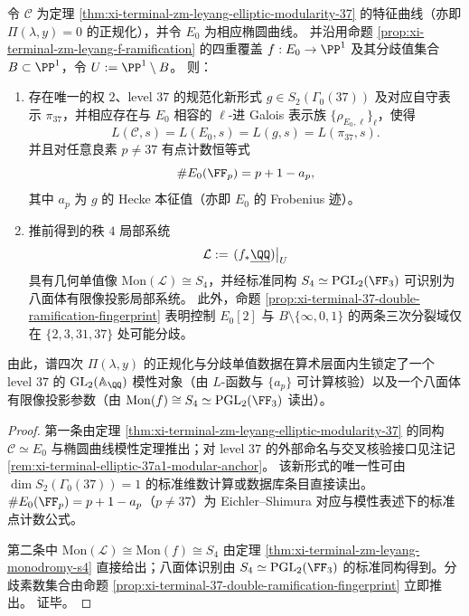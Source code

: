 \begin{corollary}\label{cor:xi-terminal-zm-leyang-langlands-level37}
令 \(\mathcal C\) 为定理 \ref{thm:xi-terminal-zm-leyang-elliptic-modularity-37} 的特征曲线（亦即 \(\Pi(\lambda,y)=0\) 的正规化），并令 \(E_0\) 为相应椭圆曲线。
并沿用命题 \ref{prop:xi-terminal-zm-leyang-f-ramification} 的四重覆盖 \(f:E_0\to\PP^1\) 及其分歧值集合 \(B\subset\PP^1\)，令 \(U:=\PP^1\setminus B\)。
则：
\begin{enumerate}
  \item 存在唯一的权 \(2\)、level \(37\) 的规范化新形式 \(g\in S_2(\Gamma_0(37))\) 及对应自守表示 \(\pi_{37}\)，并相应存在与 \(E_0\) 相容的 \(\ell\)-进 Galois 表示族 \(\{\rho_{E_0,\ell}\}_{\ell}\)，使得
  \[
  L(\mathcal C,s)=L(E_0,s)=L(g,s)=L(\pi_{37},s).
  \]
  并且对任意良素 \(p\neq 37\) 有点计数恒等式
  \[
  \#E_0(\FF_p)=p+1-a_p,
  \]
  其中 \(a_p\) 为 \(g\) 的 Hecke 本征值（亦即 \(E_0\) 的 Frobenius 迹）。
  \item 推前得到的秩 \(4\) 局部系统
  \[
  \mathcal L:=\left.(f_\ast\underline{\QQ})\right|_{U}
  \]
  具有几何单值像 \(\mathrm{Mon}(\mathcal L)\cong S_4\)，并经标准同构 \(S_4\simeq \mathrm{PGL}_2(\FF_3)\) 可识别为八面体有限像投影局部系统。\cite{MITSmallGroupsPDF}
  此外，命题 \ref{prop:xi-terminal-37-double-ramification-fingerprint} 表明控制 \(E_0[2]\) 与 \(B\setminus\{\infty,0,1\}\) 的两条三次分裂域仅在 \(\{2,3,31,37\}\) 处可能分歧。
\end{enumerate}
由此，谱四次 \(\Pi(\lambda,y)\) 的正规化与分歧单值数据在算术层面内生锁定了一个 level \(37\) 的 \(\mathrm{GL}_2(\mathbb A_\QQ)\) 模性对象（由 \(L\)-函数与 \(\{a_p\}\) 可计算核验）以及一个八面体有限像投影参数（由 \(\mathrm{Mon}(f)\cong S_4\simeq \mathrm{PGL}_2(\FF_3)\) 读出）。
\end{corollary}
\begin{proof}
第一条由定理 \ref{thm:xi-terminal-zm-leyang-elliptic-modularity-37} 的同构 \(\mathcal C\simeq E_0\) 与椭圆曲线模性定理推出；对 level \(37\) 的外部命名与交叉核验接口见注记 \ref{rem:xi-terminal-elliptic-37a1-modular-anchor}。\cite{LMFDBEllipticCurve37a1,LMFDBNewform372aa,ConradTSWFinal}
该新形式的唯一性可由 \(\dim S_2(\Gamma_0(37))=1\) 的标准维数计算或数据库条目直接读出。\cite{LMFDBNewform372aa}
\(\#E_0(\FF_p)=p+1-a_p\)（\(p\neq 37\)）为 Eichler--Shimura 对应与模性表述下的标准点计数公式。
\par
第二条中 \(\mathrm{Mon}(\mathcal L)\cong \mathrm{Mon}(f)\cong S_4\) 由定理 \ref{thm:xi-terminal-zm-leyang-monodromy-s4} 直接给出；八面体识别由 \(S_4\simeq \mathrm{PGL}_2(\FF_3)\) 的标准同构得到。分歧素数集合由命题 \ref{prop:xi-terminal-37-double-ramification-fingerprint} 立即推出。
证毕。
\end{proof}
\par

